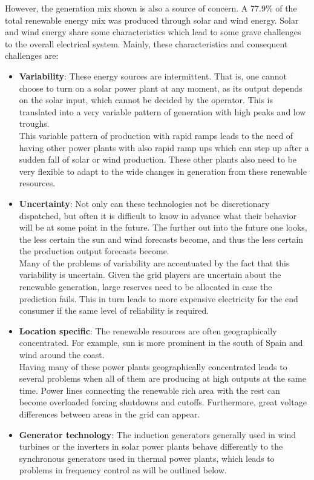 However, the generation mix shown is also a source of concern. A 77.9\% of the total renewable energy mix was produced through solar and wind energy. Solar and wind energy share some characteristics which lead to some grave challenges to the overall electrical system. Mainly, these characteristics and consequent challenges are:
\begin{itemize}
    \item \textbf{Variability}: These energy sources are intermittent. That is, one cannot choose to turn on a solar power plant at any moment, as its output depends on the solar input, which cannot be decided by the operator. This is translated into a very variable pattern of generation with high peaks and low troughs. 
    \\This variable pattern of production with rapid ramps leads to the need of having other power plants with also rapid ramp ups which can step up after a sudden fall of solar or wind production. These other plants also need to be very flexible to adapt to the wide changes in generation from these renewable resources.
    \item \textbf{Uncertainty}: Not only can these technologies not be discretionary dispatched, but often it is difficult to know in advance what their behavior will be at some point in the future. The further out into the future one looks, the less certain the sun and wind forecasts become, and thus the less certain the production output forecasts become.
    \\Many of the problems of variability are accentuated by the fact that this variability is uncertain. Given the grid players are uncertain about the renewable generation, large reserves need to be allocated in case the prediction fails. This in turn leads to more expensive electricity for the end consumer if the same level of reliability is required. 
    \item \textbf{Location specific}: The renewable resources are often geographically concentrated. For example, sun is more prominent in the south of Spain and wind around the coast. 
    \\Having many of these power plants geographically concentrated leads to several problems when all of them are producing at high outputs at the same time. Power lines connecting the renewable rich area with the rest can become overloaded forcing shutdowns and cutoffs. Furthermore, great voltage differences between areas in the grid can appear.
    \item \textbf{Generator technology}: The induction generators generally used in wind turbines or the inverters in solar power plants behave differently to the synchronous generators used in thermal power plants, which leads to problems in frequency control as will be outlined below. 

\end{itemize}
